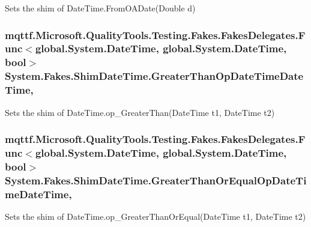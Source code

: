 Sets the shim of Date\-Time.\-From\-O\-A\-Date(\-Double d)

\hypertarget{class_system_1_1_fakes_1_1_shim_date_time_a4bf735cd94e2f99ee9f7b23ed5e4bb1a}{
\subsubsection[{Greater\-Than\-Op\-Date\-Time\-Date\-Time}]{\setlength{\rightskip}{0pt plus 5cm}mqttf.\-Microsoft.\-Quality\-Tools.\-Testing.\-Fakes.\-Fakes\-Delegates.\-Func$<$global.\-System.\-Date\-Time, global.\-System.\-Date\-Time, bool$>$ System.\-Fakes.\-Shim\-Date\-Time.\-Greater\-Than\-Op\-Date\-Time\-Date\-Time\hspace{0.3cm}{\ttfamily [static]}, {\ttfamily [set]}}}\label{class_system_1_1_fakes_1_1_shim_date_time_a4bf735cd94e2f99ee9f7b23ed5e4bb1a}


Sets the shim of Date\-Time.\-op\-\_\-\-Greater\-Than(\-Date\-Time t1, Date\-Time t2)

\hypertarget{class_system_1_1_fakes_1_1_shim_date_time_ae11b556de4d295a02bc91ca9a9ce7881}{
\subsubsection[{Greater\-Than\-Or\-Equal\-Op\-Date\-Time\-Date\-Time}]{\setlength{\rightskip}{0pt plus 5cm}mqttf.\-Microsoft.\-Quality\-Tools.\-Testing.\-Fakes.\-Fakes\-Delegates.\-Func$<$global.\-System.\-Date\-Time, global.\-System.\-Date\-Time, bool$>$ System.\-Fakes.\-Shim\-Date\-Time.\-Greater\-Than\-Or\-Equal\-Op\-Date\-Time\-Date\-Time\hspace{0.3cm}{\ttfamily [static]}, {\ttfamily [set]}}}\label{class_system_1_1_fakes_1_1_shim_date_time_ae11b556de4d295a02bc91ca9a9ce7881}


Sets the shim of Date\-Time.\-op\-\_\-\-Greater\-Than\-Or\-Equal(\-Date\-Time t1, Date\-Time t2)

